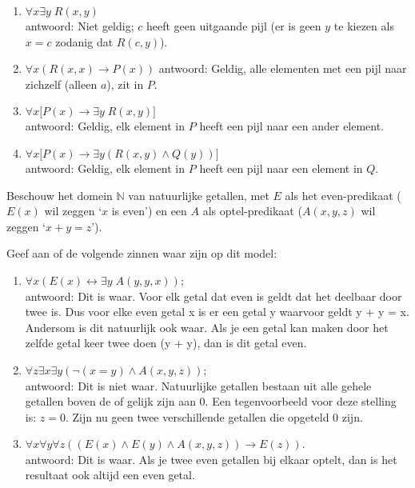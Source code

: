 \begin{answer}
\begin{enumerate}
    \item $\forall x\exists y\;R(x,y)$\\
    antwoord: Niet geldig; $c$ heeft geen uitgaande pijl (er is geen $y$ te kiezen als $x=c$ zodanig dat $R(c,y)$).
    \item $\forall x(R(x,x)\rightarrow P(x))$
    antwoord: Geldig, alle elementen met een pijl naar zichzelf (alleen $a$), zit in $P$.
    \item $\forall x\bigl[P(x)\rightarrow\exists y\;R(x,y)\bigr]$\\
    antwoord: Geldig, elk element in $P$ heeft een pijl naar een ander element.
    \item $\forall x\bigl[P(x)\rightarrow\exists y(R(x,y)\wedge Q(y))]$\\
    antwoord: Geldig, elk element in $P$ heeft een pijl naar een element in $Q$.
\end{enumerate}
\end{answer}

\begin{answer} %
Beschouw het domein $\mathbb{N}$ van natuurlijke getallen, met $E$ als het even-predikaat ($E(x)$ wil zeggen `$x$ is even') en een $A$ als optel-predikaat ($A(x,y,z)$ wil zeggen `$x+y=z$').

Geef aan of de volgende zinnen waar zijn op dit model:
\begin{enumerate}[label=\textit{\alph*.}]
\item $\forall x(E(x)\leftrightarrow\exists y\;A(y,y,x))$;\\
antwoord: Dit is waar. Voor elk getal dat even is geldt dat het deelbaar door twee is. Dus voor elke even getal x is er een getal y waarvoor geldt y + y = x. Andersom is dit natuurlijk ook waar. Als je een getal kan maken door het zelfde getal keer twee doen (y + y), dan is dit getal even.
\item $\forall z\exists x\exists y(\neg(x=y)\wedge A(x,y,z))$; \\
antwoord: Dit is niet waar. Natuurlijke getallen bestaan uit alle gehele getallen boven de of gelijk zijn aan 0. Een tegenvoorbeeld voor deze stelling is: $z = 0$. Zijn nu geen twee verschillende getallen die opgeteld 0 zijn. 
\item $\forall x\forall y\forall z((E(x)\wedge E(y)\wedge A(x, y, z))\rightarrow E(z))$. \\
antwoord: Dit is waar. Als je twee even getallen bij elkaar optelt, dan is het resultaat ook altijd een even getal.
\end{enumerate}
\end{answer}

